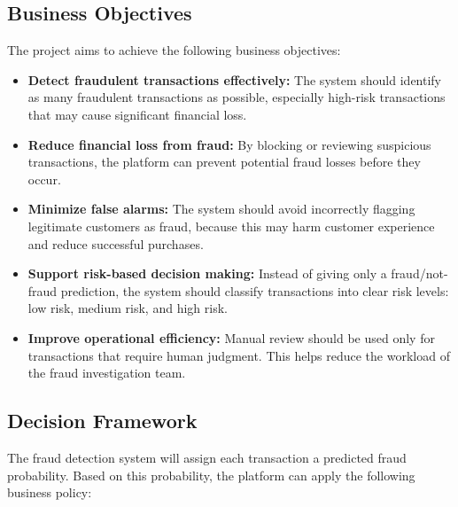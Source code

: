 \subsection{Business Objectives}
The project aims to achieve the following business objectives:
\begin{itemize}
  \item \textbf{Detect fraudulent transactions effectively:} The system should identify as many fraudulent transactions as possible, especially high-risk transactions that may cause significant financial loss.
  \item \textbf{Reduce financial loss from fraud:} By blocking or reviewing suspicious transactions, the platform can prevent potential fraud losses before they occur.
  \item \textbf{Minimize false alarms:} The system should avoid incorrectly flagging legitimate customers as fraud, because this may harm customer experience and reduce successful purchases.
  \item \textbf{Support risk-based decision making:} Instead of giving only a fraud/not-fraud prediction, the system should classify transactions into clear risk levels: low risk, medium risk, and high risk.
  \item \textbf{Improve operational efficiency:} Manual review should be used only for transactions that require human judgment. This helps reduce the workload of the fraud investigation team.
\end{itemize}

\subsection{Decision Framework}
The fraud detection system will assign each transaction a predicted fraud probability. Based on this probability, the platform can apply the following business policy:

